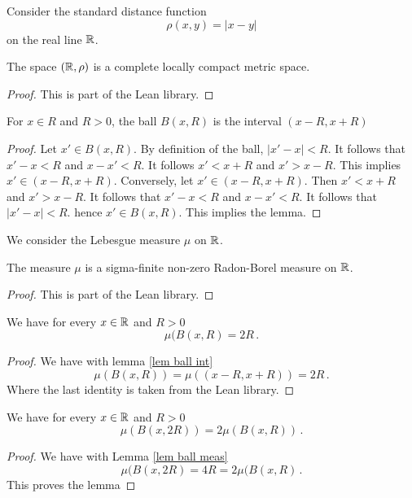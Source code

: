 Consider the standard distance function
\begin{equation}
    \rho(x,y)=|x-y|
\end{equation}
on the real line $\mathbb{R}$.
\begin{lemma}
The space $(\mathbb{R},\rho)$ is a complete locally compact metric space.
\end{lemma}
\begin{proof}
    This is part of the Lean library.
\end{proof}
\begin{lemma}\label{lem ball int}
    For $x\in R$ and $R>0$, the ball $B(x,R)$ is the interval $(x-R,x+R)$
\end{lemma}
\begin{proof}
Let $x'\in B(x,R)$. By definition of the ball,
$|x'-x|<R$. It follows that $x'-x<R$ and $x-x'<R$.
It follows $x'<x+R$ and $x'>x-R$. This implies
$x'\in (x-R,x+R)$.
Conversely, let $x'\in (x-R,x+R)$. Then
$x'<x+R$ and $x'>x-R$. It follows that
$x'-x<R$ and $x-x'<R$. It follows that $|x'-x|<R$.
hence $x'\in B(x,R)$.
This implies the lemma.
\end{proof}
We consider the Lebesgue measure $\mu$ on $\mathbb{R}$.
\begin{lemma}
    The measure $\mu$ is a sigma-finite non-zero
    Radon-Borel measure on $\mathbb{R}$.
\end{lemma}
\begin{proof}
    This is part of the Lean library.
\end{proof}
\begin{lemma}\label{lem ball meas}
    We have for every $x\in \mathbb{R}$ and $R>0$
    \begin{equation}
        \mu(B(x,R)=2R\, .
    \end{equation}
\end{lemma}
\begin{proof}
We have with lemma \ref{lem ball int}
\begin{equation}
    \mu(B(x,R))=\mu((x-R,x+R))=2R\, .
\end{equation}
Where the last identity is taken from the Lean library.
\end{proof}

\begin{lemma}\label{lem r doubling}
    We have for every $x\in \mathbb{R}$ and $R>0$
    \begin{equation}
        \mu(B(x,2R))=2\mu(B(x,R))\, .
    \end{equation}
\end{lemma}
\begin{proof}
    We have with Lemma \ref{lem ball meas}
\begin{equation}
    \mu(B(x,2R)=4R=2\mu(B(x,R)\, .
\end{equation}
This proves the lemma
\end{proof}

